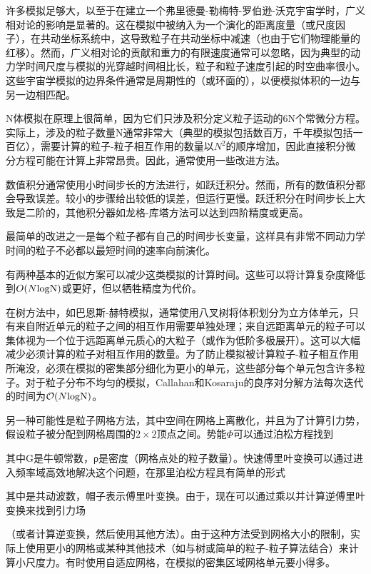 许多模拟足够大，以至于在建立一个弗里德曼-勒梅特-罗伯逊-沃克宇宙学时，广义相对论的影响是显著的。这在模拟中被纳入为一个演化的距离度量（或尺度因子），在共动坐标系统中，这导致粒子在共动坐标中减速（也由于它们物理能量的红移）。然而，广义相对论的贡献和重力的有限速度通常可以忽略，因为典型的动力学时间尺度与模拟的光穿越时间相比长，粒子和粒子速度引起的时空曲率很小。这些宇宙学模拟的边界条件通常是周期性的（或环面的），以便模拟体积的一边与另一边相匹配。

N体模拟在原理上很简单，因为它们只涉及积分定义粒子运动的6N个常微分方程。实际上，涉及的粒子数量N通常非常大（典型的模拟包括数百万，千年模拟包括一百亿），需要计算的粒子-粒子相互作用的数量以$N^2$的顺序增加，因此直接积分微分方程可能在计算上非常昂贵。因此，通常使用一些改进方法。

数值积分通常使用小时间步长的方法进行，如跃迁积分。然而，所有的数值积分都会导致误差。较小的步骤给出较低的误差，但运行更慢。跃迁积分在时间步长上大致是二阶的，其他积分器如龙格-库塔方法可以达到四阶精度或更高。

最简单的改进之一是每个粒子都有自己的时间步长变量，这样具有非常不同动力学时间的粒子不必都以最短时间的速率向前演化。

有两种基本的近似方案可以减少这类模拟的计算时间。这些可以将计算复杂度降低到$O(N \rm{log} N)$或更好，但以牺牲精度为代价。

在树方法中，如巴恩斯-赫特模拟，通常使用八叉树将体积划分为立方体单元，只有来自附近单元的粒子之间的相互作用需要单独处理；来自远距离单元的粒子可以集体视为一个位于远距离单元质心的大粒子（或作为低阶多极展开）。这可以大幅减少必须计算的粒子对相互作用的数量。为了防止模拟被计算粒子-粒子相互作用所淹没，必须在模拟的密集部分细化为更小的单元，这些部分每个单元包含许多粒子。对于粒子分布不均匀的模拟，Callahan和Kosaraju的良序对分解方法每次迭代的时间为$\mathcal O(N \rm{log} N)$。

另一种可能性是粒子网格方法，其中空间在网格上离散化，并且为了计算引力势，假设粒子被分配到网格周围的$2\times 2$顶点之间。势能$\Phi$可以通过泊松方程找到

其中G是牛顿常数，ρ是密度（网格点处的粒子数量）。快速傅里叶变换可以通过进入频率域高效地解决这个问题，在那里泊松方程具有简单的形式

其中是共动波数，帽子表示傅里叶变换。由于，现在可以通过乘以并计算逆傅里叶变换来找到引力场

（或者计算逆变换，然后使用其他方法）。由于这种方法受到网格大小的限制，实际上使用更小的网格或某种其他技术（如与树或简单的粒子-粒子算法结合）来计算小尺度力。有时使用自适应网格，在模拟的密集区域网格单元要小得多。


